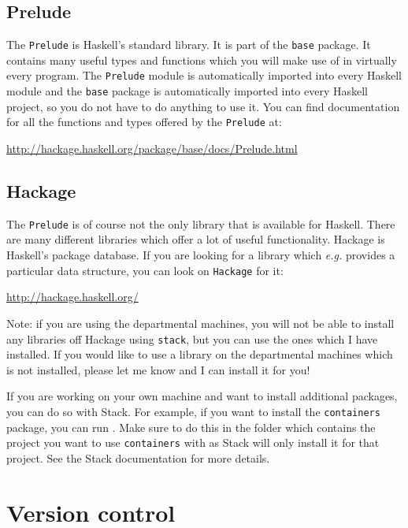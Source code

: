 \subsection{Prelude} 

The \texttt{\small Prelude} is Haskell's standard library. It is part of the \texttt{\small base} package. It contains many useful types and functions which you will make use of in virtually every program. The \texttt{\small Prelude} module is automatically imported into every Haskell module and the \texttt{\small base} package is automatically imported into every Haskell project, so you do not have to do anything to use it. You can find documentation for all the functions and types offered by the \texttt{\small Prelude} at:
\begin{center}
\url{http://hackage.haskell.org/package/base/docs/Prelude.html}
\end{center}

\subsection{Hackage} 
\label{sec:hackage}

The \texttt{\small Prelude} is of course not the only library that is available for Haskell. There are many different libraries which offer a lot of useful functionality. Hackage is Haskell's package database. If you are looking for a library which \emph{e.g.} provides a particular data structure, you can look on \texttt{\small Hackage} for it:
\begin{center}
\url{http://hackage.haskell.org/}
\end{center}
Note: if you are using the departmental machines, you will not be able to install any libraries off Hackage using \texttt{\small stack}, but you can use the ones which I have installed. If you would like to use a library on the departmental machines which is not installed, please let me know and I can install it for you!

If you are working on your own machine and want to install additional packages, you can do so with Stack. For example, if you want to install the \texttt{\small containers} package, you can run . Make sure to do this in the folder which contains the project you want to use \texttt{\small containers} with as Stack will only install it for that project. See the Stack documentation for more details.

\section{Version control}
\label{sec:git}


